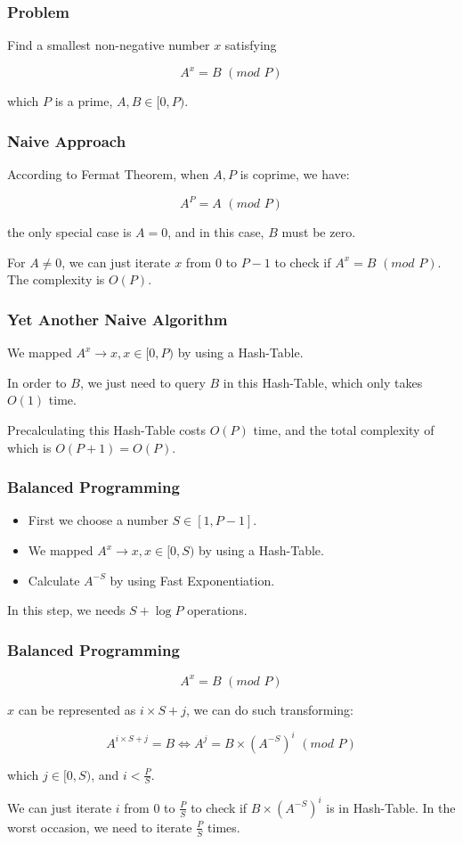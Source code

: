 \begin{frame}
\frametitle{Problem}
Find a smallest non-negative number $x$ satisfying

\[A^x = B\,\,(mod\,\,P)\]

which $P$ is a prime, $A, B \in [0, P)$.
\end{frame}
\begin{frame}
\frametitle{Naive Approach}
According to Fermat Theorem, when $A, P$ is coprime, we have:

\[A^{P} = A\,\,(mod\,\,P)\]

the only special case is $A = 0$, and in this case, $B$ must be zero.

\bigskip
For $A \neq 0$, we can just iterate $x$ from 0 to $P - 1$ to check if $A^x = B\,\,(mod\,\,P)$.
The complexity is $O(P)$.


\end{frame}
\begin{frame}
\frametitle{Yet Another Naive Algorithm}
We mapped $A^{x} \rightarrow x, x \in [0, P)$ by using a Hash-Table.

\bigskip
In order to $B$, we just need to query $B$ in this Hash-Table, which only takes $O(1)$ time.

\bigskip
Precalculating this Hash-Table costs $O(P)$ time, and the total complexity of which is $O(P + 1) = O(P)$.
\end{frame}

\begin{frame}
\frametitle{Balanced Programming}
\begin{itemize}
\item First we choose a number $S \in [1, P - 1]$.
\item We mapped $A^{x} \rightarrow x, x \in [0, S)$ by using a Hash-Table.
\item Calculate $A^{-S}$ by using Fast Exponentiation.
\end{itemize}

\bigskip
In this step, we needs $S + \log P$ operations.
\end{frame}

\begin{frame}
\frametitle{Balanced Programming}

\[A^x = B\,\,(mod\,\,P)\]

$x$ can be represented as $i\times S + j$, we can do such transforming:

\[A^{i\times S + j} = B \Leftrightarrow A^{j} = B \times (A^{-S})^{i}\,\,(mod\,\,P)\]

which $j \in [0, S)$, and $i < \frac{P}{S}$.

\bigskip
We can just iterate $i$ from 0 to $\frac{P}{S}$ to check if $B \times (A^{-S})^{i}$ is in Hash-Table. In the worst occasion, we need to iterate $\frac{P}{S}$ times.
\end{frame}


